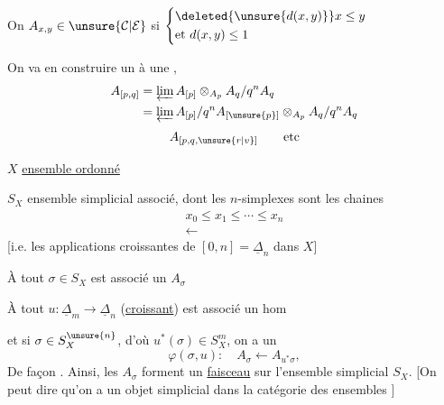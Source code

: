  On  $A_{x,y}\in\unsure{\mathcal C|\mathcal E}$ si $\left\{\begin{aligned}&\deleted{\unsure{d(x,y)}}x\leq y\\&\text{et }d(x,y)\leq1\end{aligned}\right.$

On va en construire un   à une  ,
\[
\begin{aligned}
A_{[p,q]}&=\varprojlim A_{[p]}\otimes_{A_p}A_q/q^n A_q\\
&=\varprojlim A_{[p]}/q^n A_{[\unsure{p}]}\otimes_{A_p}A_q/q^n A_q
\end{aligned}
\]
\[A_{[p,q,\unsure{r|v}]}\qquad\text{etc}\]

$X$ \uline{ensemble ordonné}

$S_X$ ensemble simplicial associé, dont les $n$-simplexes sont les chaines
\[
\begin{aligned}
x_0\leq x_1\leq\cdots\leq x_n\\
\longleftarrow
\end{aligned}
\]
[i.e. les applications croissantes de $[0,n]=\underline\Delta_n$ dans $X$]

À tout $\sigma\in S_X$ est associé un $A_\sigma$

À tout    $u:\underline\Delta_m\longrightarrow\underline\Delta_n$ (\uline{croissant}) est associé un hom

et si $\sigma\in S_X^{\unsure{n}}$, d'où $u^*(\sigma)\in S_X^m$, on a un 
\[
\varphi(\sigma,u):\quad A_\sigma\longleftarrow A_{u^*\sigma},
\]
De façon .
Ainsi, les $A_\sigma$ forment un \uline{faisceau} sur l'ensemble simplicial $S_X$.  [On peut dire qu'on a un objet simplicial dans la catégorie des ensembles  ]


